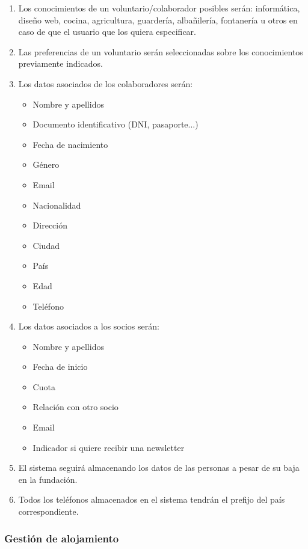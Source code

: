\begin{enumerate}[start=6,label={RNF-\arabic*.}]
    \item Los conocimientos de un voluntario/colaborador posibles serán: informática, diseño web, cocina, agricultura, guardería, albañilería, fontanería u otros en caso de que el usuario que los quiera especificar.
    \item Las preferencias de un voluntario serán seleccionadas sobre los conocimientos previamente indicados.
    \item Los datos asociados de los colaboradores serán:
        \begin{itemize}
            \item Nombre y apellidos
            \item Documento identificativo (DNI, pasaporte...)
            \item Fecha de nacimiento
            \item Género
            \item Email
            \item Nacionalidad
            \item Dirección
            \item Ciudad
            \item País
            \item Edad
            \item Teléfono
        \end{itemize}
    \item Los datos asociados a los socios serán:
        \begin{itemize}
            \item Nombre y apellidos
            \item Fecha de inicio
            \item Cuota
            \item Relación con otro socio
            \item Email
            \item Indicador si quiere recibir una newsletter
        \end{itemize}
    \item El sistema seguirá almacenando los datos de las personas a pesar de su baja en la fundación.
    \item Todos los teléfonos almacenados en el sistema tendrán el prefijo del país correspondiente.

\end{enumerate}

\subsubsection{Gestión de alojamiento}

